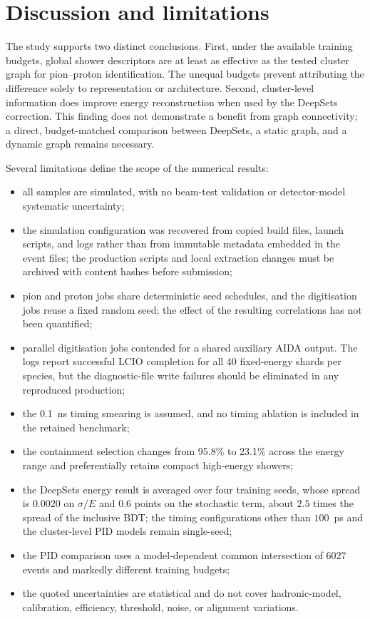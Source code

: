 \documentclass[11pt,a4paper]{article}
\begin{document}
\section{Discussion and limitations}
\label{sec:limitations}

The study supports two distinct conclusions. First, under the available training
budgets, global shower descriptors are at least as effective as the tested cluster
graph for pion--proton identification. The unequal budgets prevent attributing the
difference solely to representation or architecture. Second, cluster-level information
does improve energy reconstruction when used by the DeepSets correction. This finding
does not demonstrate a benefit from graph connectivity; a direct, budget-matched
comparison between DeepSets, a static graph, and a dynamic graph remains necessary.

Several limitations define the scope of the numerical results:
\begin{itemize}
  \item all samples are simulated, with no beam-test validation or detector-model
        systematic uncertainty;
  \item the simulation configuration was recovered from copied build files, launch
        scripts, and logs rather than from immutable metadata embedded in the event
        files; the production scripts and local extraction changes must be archived
        with content hashes before submission;
  \item pion and proton jobs share deterministic seed schedules, and the digitisation
        jobs reuse a fixed random seed; the effect of the resulting correlations has
        not been quantified;
  \item parallel digitisation jobs contended for a shared auxiliary AIDA output. The
        logs report successful LCIO completion for all 40 fixed-energy shards per
        species, but the diagnostic-file write failures should be eliminated in any
        reproduced production;
  \item the \SI{0.1}{ns} timing smearing is assumed, and no timing ablation is included
        in the retained benchmark;
  \item the containment selection changes from 95.8\% to 23.1\% across the energy
        range and preferentially retains compact high-energy showers;
  \item the DeepSets energy result is averaged over four training seeds, whose
        spread is $0.0020$ on $\sigma/E$ and $0.6$ points on the stochastic term,
        about $2.5$ times the spread of the inclusive BDT; the timing configurations
        other than $100$~ps and the cluster-level PID models remain single-seed;
  \item the PID comparison uses a model-dependent common intersection of 6027 events
        and markedly different training budgets;
  \item the quoted uncertainties are statistical and do not cover hadronic-model,
        calibration, efficiency, threshold, noise, or alignment variations.
\end{itemize}
\end{document}
